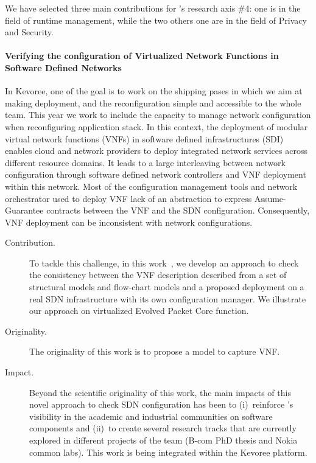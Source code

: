 We have selected three main contributions for \team's research axis \#4:
one is in the field of runtime management, while the two others one are in the field of Privacy and Security.



\paragraph{Verifying the configuration of Virtualized Network Functions in Software Defined Networks}

In Kevoree, one of the goal is to work on the shipping pases in which we aim at making deployment, and the reconfiguration simple and accessible to the whole team. This year we work to include the capacity to manage network configuration when reconfiguring application stack. In this context, the deployment of modular virtual network functions (VNFs) in software defined infrastructures (SDI) enables cloud and network providers to deploy integrated network services across different resource domains. It leads to a large interleaving between network configuration through software defined network controllers and VNF deployment within this network. Most of the configuration management tools and network orchestrator used to deploy VNF lack of an abstraction to express Assume-Guarantee contracts between the VNF and the SDN configuration. Consequently, VNF deployment can be inconsistent with network configurations. 


\begin{description}

\item[Contribution.] To tackle this challenge, in this work~\cite{pelay:hal-01657866}, we develop an approach to check the consistency between the VNF description described from a set of structural models and flow-chart models and a proposed deployment on a real SDN infrastructure with its own configuration manager. We illustrate our approach on virtualized Evolved Packet Core function.
\item[Originality.] The originality of this work is to propose a model to capture VNF. 
\item[Impact.]  Beyond the scientific originality of this work, the main impacts of this novel approach to check SDN configuration has been to (i)~reinforce {\team}'s visibility in the academic and industrial communities on software components and (ii)~to create several research tracks that are currently explored in different projects of the team (B-com PhD thesis and Nokia common labs). This work is being integrated within the Kevoree platform.  
\end{description}

